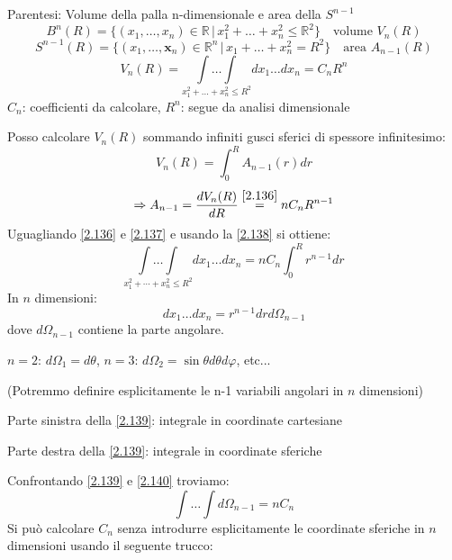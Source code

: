 \documentclass[a4paper,11pt]{report}
\newcommand{\R}{\mathbb{R}}
\newcommand{\Rn}{\mathbb{R}^n}
\newcommand{\x}{\boldsymbol{x}}
\begin{document}
\medskip

Parentesi: Volume della palla n-dimensionale e area della $S^{n-1}$
\[
B^n(R)=\{(x_1,\dots,x_n)\in \R \,| \,x_1^2 + \dots + x_n^2\leq \R^2\} \quad \text{volume $V_n(R)$}
\]
\[
S^{n-1}(R)=\{(x_1,\dots,\x_n)\in\Rn \,|\, x_1 + \dots + x_n^2=R^2 \} \quad \text{area $A_{n-1}(R)$}
\]
\begin{equation}
V_n(R)=\underset{x_1^2 + \ldots + x_n^2 \leq R^2}{\int \ldots \int} dx_1\ldots dx_n = C_n R^n 
\label{2.136}
\end{equation}
$C_n$: coefficienti da calcolare, $R^n$: segue da analisi dimensionale

Posso calcolare $V_n(R)$ sommando infiniti gusci sferici di spessore infinitesimo:
\begin{equation}
V_n(R)=\int_0^R A_{n-1}(r)dr
\label{2.137}
\end{equation}
\begin{equation}
\Rightarrow A_{n-1}=\frac{dV_n(R)}{dR}\overset{\eqref{2.136}}{=} nC_n R^{n-1}
\label{2.138}
\end{equation}
Uguagliando \eqref{2.136} e \eqref{2.137} e usando la \eqref{2.138} si ottiene:
\begin{equation}
\underset{x_1^2 + \cdots + x_n^2 \leq R^2}{\int \dots \int} dx_1\ldots dx_n = n C_n \int_0^R r^{n-1}dr
\label{2.139}
\end{equation}
In $n$ dimensioni: 
\begin{equation}
dx_1 \ldots dx_n=r^{n-1}drd\Omega_{n-1}
\label{2.140}
\end{equation}
dove $d\Omega_{n-1} $ contiene la parte angolare.

$n=2$: $d\Omega_1=d\theta$, $n=3$: $d\Omega_2=\sin\theta d\theta d\varphi$, etc... 

(Potremmo definire esplicitamente le n-1 variabili angolari in $n$ dimensioni)

Parte sinistra della \eqref{2.139}: integrale in coordinate cartesiane

Parte destra della \eqref{2.139}: integrale in coordinate sferiche

Confrontando \eqref{2.139} e \eqref{2.140} troviamo:
\begin{equation}
\int \ldots \int d\Omega_{n-1}=nC_n
\label{2.141}
\end{equation}
Si pu\`o calcolare $C_n$ senza introdurre esplicitamente le coordinate sferiche in $n$ dimensioni usando il seguente trucco: 
\end{document}
